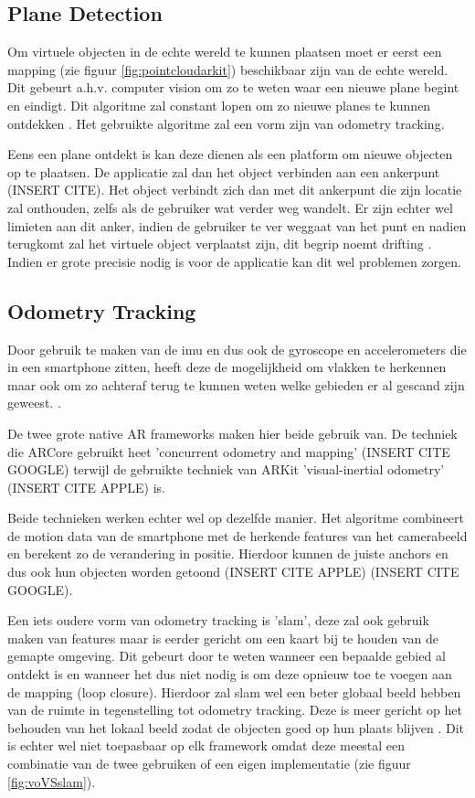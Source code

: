 \subsection{Plane Detection}
Om virtuele objecten in de echte wereld te kunnen plaatsen moet er eerst een mapping (zie figuur \ref{fig:pointcloudarkit}) beschikbaar zijn van de echte wereld. Dit gebeurt a.h.v. computer vision om zo te weten waar een nieuwe plane begint en eindigt. Dit algoritme zal constant lopen om zo nieuwe planes te kunnen ontdekken \autocite{Xu2018}. Het gebruikte algoritme zal een vorm zijn van odometry tracking.

Eens een plane ontdekt is kan deze dienen als een platform om nieuwe objecten op te plaatsen. De applicatie zal dan het object verbinden aan een ankerpunt (INSERT CITE). Het object verbindt zich dan met dit ankerpunt die zijn locatie zal onthouden, zelfs als de gebruiker wat verder weg wandelt. Er zijn echter wel limieten aan dit anker, indien de gebruiker te ver weggaat van het punt en nadien terugkomt zal het virtuele object verplaatst zijn, dit begrip noemt drifting \autocite{You1999}. Indien er grote precisie nodig is voor de applicatie kan dit wel problemen zorgen.

\subsection{Odometry Tracking}

Door gebruik te maken van de \acrshort{imu} en dus ook de gyroscope en accelerometers die in een smartphone zitten, heeft deze de mogelijkheid om vlakken te herkennen maar ook om zo achteraf terug te kunnen weten welke gebieden er al gescand zijn geweest. \autocite{Leutenegger2015}.

De twee grote native AR frameworks maken hier beide gebruik van. De techniek die ARCore gebruikt heet 'concurrent odometry and mapping' (INSERT CITE GOOGLE) terwijl de gebruikte techniek van ARKit 'visual-inertial odometry' (INSERT CITE APPLE) is. 

Beide technieken werken echter wel op dezelfde manier. Het algoritme combineert de motion data van de smartphone met de herkende features van het camerabeeld en berekent zo de verandering in positie. Hierdoor kunnen de juiste anchors en dus ook hun objecten worden getoond (INSERT CITE APPLE) (INSERT CITE GOOGLE).

Een iets oudere vorm van odometry tracking is '\acrfull{slam}', deze zal ook gebruik maken van features maar is eerder gericht om een kaart bij te houden van de gemapte omgeving. Dit gebeurt door te weten wanneer een bepaalde gebied al ontdekt is en wanneer het dus niet nodig is om deze opnieuw toe te voegen aan de mapping (loop closure). Hierdoor zal \acrshort{slam} wel een beter globaal beeld hebben van de ruimte in tegenstelling tot odometry tracking. Deze is meer gericht op het behouden van het lokaal beeld zodat de objecten goed op hun plaats blijven \autocite{Yousif2015}. Dit is echter wel niet toepasbaar op elk framework omdat deze meestal een combinatie van de twee gebruiken of een eigen implementatie (zie figuur \ref{fig:voVSslam}).

